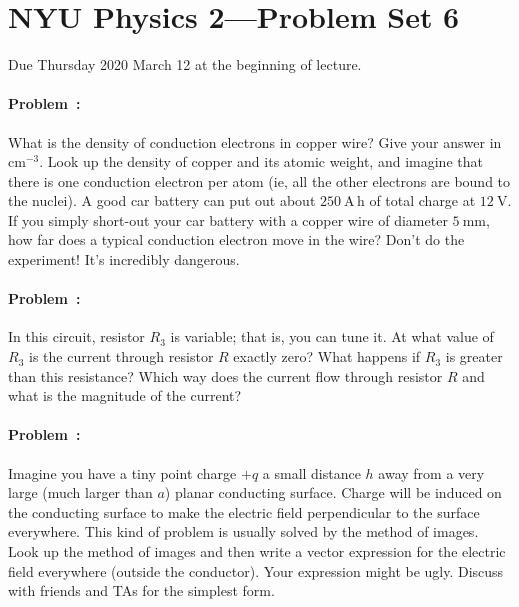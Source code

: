 \documentclass[12pt]{article}
\begin{document}
\section*{NYU Physics 2---Problem Set 6}

Due Thursday 2020 March 12 at the beginning of lecture.

\paragraph{Problem~\theproblem:}%
What is the density of conduction electrons in copper wire?  Give your
answer in $\mathrm{cm^{-3}}$.  Look up the density of copper and its
atomic weight, and imagine that there is one conduction electron per
atom (ie, all the other electrons are bound to the nuclei).  A good
car battery can put out about $250~\mathrm{A\,h}$ of total charge at
$12~\mathrm{V}$.  If you simply short-out your car battery with a
copper wire of diameter $5~\mathrm{mm}$, how far does a typical
conduction electron move in the wire? Don't do the experiment! It's
incredibly dangerous.

\paragraph{Problem~\theproblem:}%
In this circuit, resistor $R_3$ is variable; that is, you can tune it. At what value of $R_3$
is the current through resistor $R$ exactly zero? What happens if $R_3$ is
greater than this resistance? Which way does the current flow through resistor $R$ and what is
the magnitude of the current?

\paragraph{Problem~\theproblem:}%
Imagine you have a tiny point charge $+q$ a small distance $h$ away
from a very large (much larger than $a$) planar conducting surface. Charge
will be induced on the conducting surface to make the electric field
perpendicular to the surface everywhere. This kind of problem is usually
solved by the method of images. Look up the method of images and
then write a vector expression for the electric field everywhere (outside
the conductor). Your expression might be ugly. Discuss with friends and
TAs for the simplest form.
\end{document}
